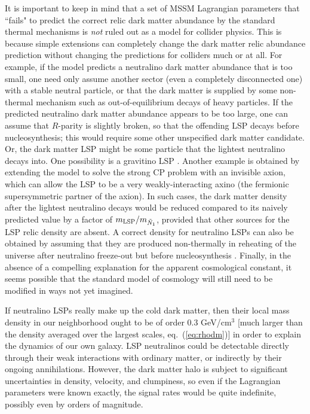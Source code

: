 \documentclass[11pt]{article}
\begin{document}
It is important to keep in mind that a set of MSSM Lagrangian 
parameters that ``fails" to predict the correct relic dark matter abundance 
by the standard thermal mechanisms is {\em not} ruled out as a model for 
collider physics. This is because simple extensions can completely change 
the dark matter relic abundance prediction without changing the predictions for 
colliders much or at all. For example, if the model predicts a neutralino 
dark matter abundance that is too small, one need only assume another 
sector (even a completely disconnected one) with a stable neutral 
particle, or that the dark matter is supplied by some non-thermal 
mechanism such as out-of-equilibrium decays of heavy particles. If the 
predicted neutralino dark matter abundance appears to be too large, one 
can assume that $R$-parity is slightly broken, so that the offending LSP 
decays before nucleosynthesis; this would require some other unspecified 
dark matter candidate. Or, the dark matter LSP might be some particle that 
the lightest neutralino decays into. One possibility is a gravitino LSP 
\cite{gravitinoDMfromdecays}.  Another example is obtained by extending 
the model to solve the strong CP problem with an invisible axion, which 
can allow the LSP to be a very weakly-interacting axino \cite{axinoDM} 
(the fermionic supersymmetric partner of the axion). In such cases, the 
dark matter density after the lightest neutralino decays would be reduced 
compared to its naively predicted value by a factor of $m_{\rm 
LSP}/m_{\tilde N_1}$, provided that other sources for the LSP relic 
density are absent. A correct density for neutralino LSPs can also be 
obtained by assuming that they are produced non-thermally in reheating of 
the universe after neutralino freeze-out but before nucleosynthesis 
\cite{gelgon}. Finally, in the absence of a compelling explanation for the 
apparent cosmological constant, it seems possible that the standard model 
of cosmology will still need to be modified in ways not yet imagined.

If neutralino LSPs really make up the cold dark matter, then their local 
mass density in our neighborhood ought to be of order 0.3 GeV/cm$^3$ [much 
larger than the density averaged over the largest scales, 
eq.~(\ref{eq:rhodm})] in order to explain the dynamics of our own galaxy. 
LSP neutralinos could be detectable directly through their weak 
interactions with ordinary matter, or indirectly by their ongoing 
annihilations. However, the dark matter halo is subject to significant uncertainties 
in density, velocity, and clumpiness, so even if the Lagrangian 
parameters were known exactly, the signal rates would be quite indefinite, 
possibly even by orders of magnitude.
\end{document}
